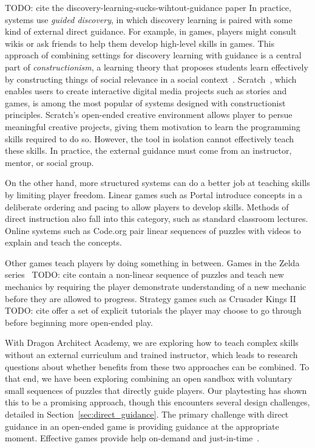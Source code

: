 \documentclass{sig-alternate}
\newcommand{\TODO}[1]{{\color{red} TODO: #1}}
\newcommand{\gametitle}{{\color{RoyalPurple} Dragon Architect Academy}}
\begin{document}
\TODO{cite the discovery-learning-sucks-wihtout-guidance paper}
In practice, systems use \emph{guided discovery}, in which discovery learning is paired with some kind of external direct guidance.  For example, in games, players might consult wikis or ask friends to help them develop high-level skills in games.
This approach of combining settings for discovery learning with guidance is a central part of \emph{constructionism}, a learning theory that proposes students learn effectively by constructing things of social relevance in a social context~\cite{kafai06constructionism}.
Scratch~\cite{maloney2010scratch}, which enables users to create interactive digital media projects such as stories and games, is among the most popular of systems designed with constructionist principles.
Scratch's open-ended creative environment allows player to persue meaningful creative projects, giving them motivation to learn the programming skills required to do so.
However, the tool in isolation cannot effectively teach these skills.
In practice, the external guidance must come from an instructor, mentor, or social group.

On the other hand, more structured systems can do a better job at teaching skills by limiting player freedom.
Linear games such as Portal introduce concepts in a deliberate ordering and pacing to allow players to develop skills.
Methods of direct instruction also fall into this category, such as standard classroom lectures.
Online systems such as Code.org pair linear sequences of puzzles with videos to explain and teach the concepts.

Other games teach players by doing something in between. 
Games in the Zelda series~\TODO{cite} contain a non-linear sequence of puzzles and teach new mechanics by requiring the player demonstrate understanding of a new mechanic before they are allowed to progress. 
Strategy games such as Crusader Kings II~\TODO{cite} offer a set of explicit tutorials the player may choose to go through before beginning more open-ended play.

With \gametitle{}, we are exploring how to teach complex skills without an external curriculum and trained instructor, which leads to research questions about whether benefits from these two approaches can be combined.
To that end, we have been exploring combining an open sandbox with voluntary small sequences of puzzles that directly guide players.
Our playtesting has shown this to be a promising approach, though this encounters several design challenges, detailed in Section~\ref{sec:direct_guidance}.
The primary challenge with direct guidance in an open-ended game is providing guidance at the appropriate moment.
Effective games provide help on-demand and just-in-time~\cite{gee2003video}.
\end{document}
